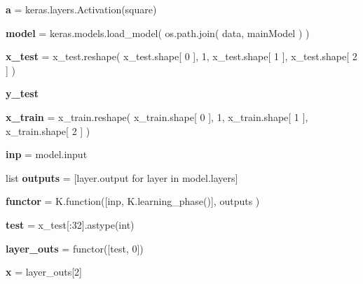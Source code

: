 \begin{DoxyCompactItemize}
\item 
\mbox{\label{namespacelayer2only_a4429322c266fbb0cda967aaf848129fc}} 
{\bfseries a} = keras.\+layers.\+Activation(square)
\item 
\mbox{\label{namespacelayer2only_aab20bc6ebb1584353f8eeb7ed1d953e8}} 
{\bfseries model} = keras.\+models.\+load\+\_\+model( os.\+path.\+join( \textquotesingle{}data\textquotesingle{}, \textquotesingle{}main\+Model\textquotesingle{} ) )
\item 
\mbox{\label{namespacelayer2only_a4cb1af381f9dce3e87d2cce40f4474cc}} 
{\bfseries x\+\_\+test} = x\+\_\+test.\+reshape( x\+\_\+test.\+shape\mbox{[} 0 \mbox{]}, 1, x\+\_\+test.\+shape\mbox{[} 1 \mbox{]}, x\+\_\+test.\+shape\mbox{[} 2 \mbox{]} )
\item 
\mbox{\label{namespacelayer2only_a4aaeed8f24642ad8ede050605dbcaf79}} 
{\bfseries y\+\_\+test}
\item 
\mbox{\label{namespacelayer2only_a66c66c75510f6a6a8bddc48d7084e1a6}} 
{\bfseries x\+\_\+train} = x\+\_\+train.\+reshape( x\+\_\+train.\+shape\mbox{[} 0 \mbox{]}, 1, x\+\_\+train.\+shape\mbox{[} 1 \mbox{]}, x\+\_\+train.\+shape\mbox{[} 2 \mbox{]} )
\item 
\mbox{\label{namespacelayer2only_a58ef2015db4fb834bb9b001d329ce15f}} 
{\bfseries inp} = model.\+input
\item 
\mbox{\label{namespacelayer2only_ae77b5fc2d7be4be1e4ba0224b54b0ad2}} 
list {\bfseries outputs} = \mbox{[}layer.\+output for layer in model.\+layers\mbox{]}
\item 
\mbox{\label{namespacelayer2only_a005007cdbfc794fcfa03dd54832f4b0d}} 
{\bfseries functor} = K.\+function(\mbox{[}inp, K.\+learning\+\_\+phase()\mbox{]}, outputs )
\item 
\mbox{\label{namespacelayer2only_abd8ffd614261507b27ce4bb9b859b0cf}} 
{\bfseries test} = x\+\_\+test\mbox{[}\+:32\mbox{]}.astype(int)
\item 
\mbox{\label{namespacelayer2only_a666be3428c0b92a0b5ee2d5be22c5110}} 
{\bfseries layer\+\_\+outs} = functor(\mbox{[}test, 0\mbox{]})
\item 
\mbox{\label{namespacelayer2only_ada50491fbd3205e526260241f6141673}} 
{\bfseries x} = layer\+\_\+outs\mbox{[}2\mbox{]}
\end{DoxyCompactItemize}


